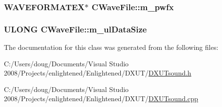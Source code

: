 \label{class_c_wave_file_afe9cccf84bd794e6f55c3e5e06f558a8}
\hypertarget{class_c_wave_file_af6ddc54fd08fab871fb6dea739bde255}{
\subsubsection[{m\_\-pwfx}]{\setlength{\rightskip}{0pt plus 5cm}WAVEFORMATEX$\ast$ {\bf CWaveFile::m\_\-pwfx}}}
\label{class_c_wave_file_af6ddc54fd08fab871fb6dea739bde255}
\hypertarget{class_c_wave_file_ab6a9adffa66b801758e14431b9fa988d}{
\subsubsection[{m\_\-ulDataSize}]{\setlength{\rightskip}{0pt plus 5cm}ULONG {\bf CWaveFile::m\_\-ulDataSize}}}
\label{class_c_wave_file_ab6a9adffa66b801758e14431b9fa988d}


The documentation for this class was generated from the following files:\begin{DoxyCompactItemize}
\item 
C:/Users/doug/Documents/Visual Studio 2008/Projects/enlightened/Enlightened/DXUT/\hyperlink{_d_x_u_tsound_8h}{DXUTsound.h}\item 
C:/Users/doug/Documents/Visual Studio 2008/Projects/enlightened/Enlightened/DXUT/\hyperlink{_d_x_u_tsound_8cpp}{DXUTsound.cpp}\end{DoxyCompactItemize}
